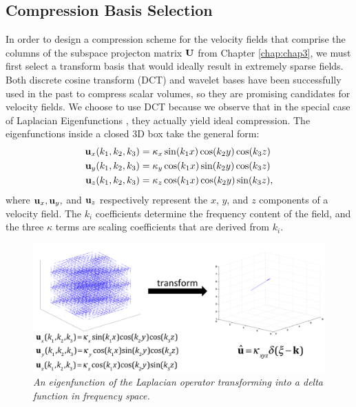 \subsection{Compression Basis Selection}
\label{sec:laplacian}

In order to design a compression scheme for the velocity fields that comprise the columns of the subspace projecton matrix $\mathbf{U}$ from Chapter \ref{chap:chap3}, we must first select a transform basis that would ideally result in extremely sparse fields. Both discrete cosine transform (DCT) \cite{Yeo:1995:VRD} and wavelet \cite{guthe2002,treib12turbulence} bases have been successfully used in the past to compress scalar volumes, so they are promising candidates for velocity fields. We choose to use DCT because we observe that in the special case of Laplacian Eigenfunctions \cite{deWitt:2012}, they actually yield ideal compression. The eigenfunctions inside a closed 3D box take the general form:
\begin{equation}
\begin{split}
\mathbf{u}_x(k_1,k_2,k_3) &= \kappa_x \sin(k_1 x) \cos(k_2 y) \cos(k_3 z) \\
\mathbf{u}_y(k_1,k_2,k_3) &= \kappa_y \cos(k_1 x) \sin(k_2 y) \cos(k_3 z) \\
\mathbf{u}_z(k_1,k_2,k_3) &= \kappa_z \cos(k_1 x) \cos(k_2 y) \sin(k_3 z),
\end{split}
\end{equation}
where $\mathbf{u}_x, \mathbf{u}_y,$ and $\mathbf{u}_z$ respectively represent the $x$, $y$, and $z$ components of a velocity field. The $k_i$ coefficients determine the frequency content of the field, and the three $\kappa$ terms are scaling coefficients that are derived from $k_i$.

\begin{figure}
\label{fig:laplacians}
\includegraphics[width=\textwidth]{chap4/figures/laplacian_sparsity.png}
\caption{\em An eigenfunction of the Laplacian operator transforming into a delta function in frequency space.}
\end{figure}

